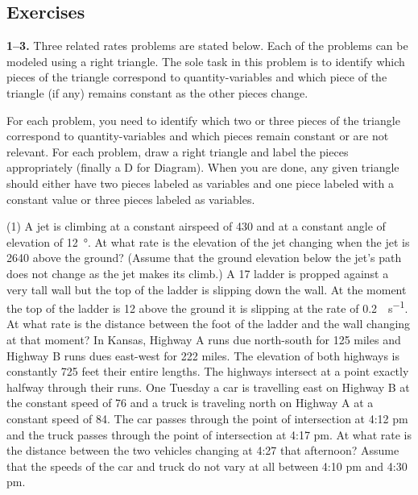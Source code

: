 \documentclass[10pt,oneside,]{book}
\newcommand{\acronym}[1]{#1}
\theoremstyle{plain}
\theoremstyle{definition}
\numberwithin{equation}{section}
\begin{document}
\subsection[Exercises]{Exercises}\label{exercises-53}
\textbf{1--3. }\hypertarget{exercisegroup-related-rates-using-diagrams}{\null}Three related rates problems are stated below. Each of the problems can be modeled using a right triangle. The sole task in this problem is to identify which pieces of the triangle correspond to quantity-variables and which piece of the triangle (if any) remains constant as the other pieces change.%
\par
For each problem, you need to identify which two or three pieces of the triangle correspond to quantity-variables and which pieces remain constant or are not relevant. For each problem, draw a right triangle and label the pieces appropriately (finally a \acronym{D} for Diagram). When you are done, any given triangle should either have two pieces labeled as variables and one piece labeled with a constant value or three pieces labeled as variables.%
\par
\begin{exercisegroup}(1)
\exercise[1.]\hypertarget{exercise-triangle-first}{\null}A jet is climbing at a constant airspeed of \SI{430}{\mileperhour} and at a constant angle of elevation of \SI{12}{\degree}. At what rate is the elevation of the jet changing when the jet is \SI{2640}{\foot} above the ground? (Assume that the ground elevation below the jet's path does not change as the jet makes its climb.)%
\exercise[2.]\hypertarget{exercise-552}{\null}A \SI{17}{\foot} ladder is propped against a very tall wall but the top of the ladder is slipping down the wall. At the moment the top of the ladder is \SI{12}{\foot} above the ground it is slipping at the rate of \SI{0.2}{\foot\per\second}. At what rate is the distance between the foot of the ladder and the wall changing at that moment?%
\exercise[3.]\hypertarget{exercise-triangle-last}{\null}In Kansas, Highway A runs due north-south for \num{125} miles and Highway B runs dues east-west for \num{222} miles. The elevation of both highways is constantly \num{725} feet their entire lengths. The highways intersect at a point exactly halfway through their runs. One Tuesday a car is travelling east on Highway B at the constant speed of \SI{76}{\mileperhour} and a truck is traveling north on Highway A at a constant speed of \SI{84}{\mileperhour}. The car passes through the point of intersection at 4:12 pm and the truck passes through the point of intersection at 4:17 pm. At what rate is the distance between the two vehicles changing at 4:27 that afternoon? Assume that the speeds of the car and truck do not vary at all between 4:10 pm and 4:30 pm.%
\end{exercisegroup}
\end{document}
